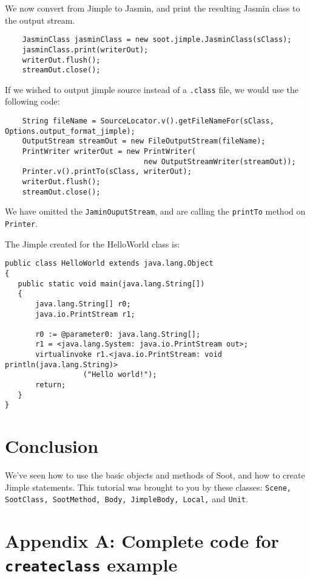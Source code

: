 \documentclass{article}
\begin{document}
We now convert from Jimple to Jasmin, and print the resulting Jasmin class to 
the output stream.

\begin{verbatim}
    JasminClass jasminClass = new soot.jimple.JasminClass(sClass);
    jasminClass.print(writerOut);
    writerOut.flush();
    streamOut.close();
\end{verbatim}

If we wished to output jimple source instead of a {\tt .class} file, we would 
use the following code:

\begin{verbatim}
    String fileName = SourceLocator.v().getFileNameFor(sClass, Options.output_format_jimple);
    OutputStream streamOut = new FileOutputStream(fileName);
    PrintWriter writerOut = new PrintWriter(
                                new OutputStreamWriter(streamOut));
    Printer.v().printTo(sClass, writerOut);
    writerOut.flush();
    streamOut.close();
\end{verbatim}

We have omitted the {\tt JaminOuputStream}, and are calling the {\tt printTo} 
method on {\tt Printer}.

The Jimple created for the HelloWorld class is:

\begin{verbatim}
public class HelloWorld extends java.lang.Object
{
   public static void main(java.lang.String[])
   {
       java.lang.String[] r0;
       java.io.PrintStream r1;

       r0 := @parameter0: java.lang.String[];
       r1 = <java.lang.System: java.io.PrintStream out>;
       virtualinvoke r1.<java.io.PrintStream: void println(java.lang.String)>
                  ("Hello world!");
       return;
   }
}
\end{verbatim}

\section{Conclusion}

We've seen how to use the basic objects and methods of
Soot, and how to create Jimple statements.  This tutorial was
brought to you by these classes: {\tt Scene, SootClass, SootMethod,
Body, JimpleBody, Local,} and {\tt Unit}.

\section*{Appendix A: Complete code for {\tt createclass} example}
\end{document}
